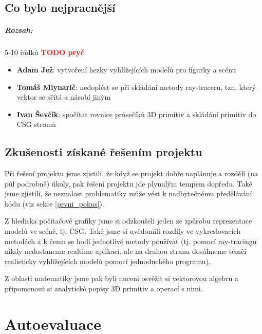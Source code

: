 \documentclass[12pt,a4paper,titlepage,final]{report}
\newcommand\AuthorA{Adam Jež}
\newcommand\AuthorB{Tomáš Mlynarič}
\newcommand\AuthorC{Ivan Ševčík}
\begin{document}
\section{Co bylo nejpracnější}

\paragraph{Rozsah:} 5-10 řádků \textcolor{red}{\textbf{TODO pryč}}

\begin{itemize}
\item \textbf{\AuthorA}: vytvoření hezky vyhlížejících modelů pro figurky a scénu
\item \textbf{\AuthorB}: nedoplést se při skládání metody ray-traceru, tzn. který vektor se sčítá a násobí jiným
\item \textbf{\AuthorC}: spočítat rovnice průsečíků 3D primitiv a skládání primitiv do CSG stromů
\end{itemize}


\section{Zkušenosti získané řešením projektu}

Při řešení projektu jsme zjistili, že když se projekt dobře naplánuje a rozdělí (na půl podrobně) úkoly, pak řešení projektu jde plynulým tempem dopředu. Také jsme zjistili, že neznalost problematiky může vést k nadbytečnému předělávání kódu (viz sekce \ref{prvni_pokus}).

Z hlediska počítačové grafiky jsme si odzkoušeli jeden ze způsobu reprezentace modelů ve scéně, tj. CSG. Také jsme si uvědomili rozdíly ve vykreslovacích metodách a k čemu se hodí jednotlivé metody používat (tj. pomocí ray-tracingu nikdy nedostaneme realtime aplikaci, ale na druhou stranu dosáhneme téměř realisticky vyhlížejících modelů pomocí jednoduchého programu). 

Z oblasti matematiky jsme pak byli nuceni osvěžit si vektorovou algebru a připomenout si analytické popisy 3D primitiv a operací s nimi.

\chapter{Autoevaluace}
\end{document}
